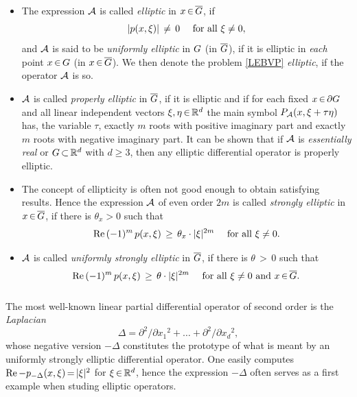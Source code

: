 \documentclass[11pt,twoside]{article}
\begin{document}
\begin{itemize}[leftmargin=12mm]
\item[(E-1)]
The expression ${\mathcal{A}}$ is called \textit{elliptic} in $x {\,\in\,} \overline{G}$,
if
\[
\abs{p(x,\xi)} \, \neq \, 0 \qfa \xi \neq 0,
\]
and ${\mathcal{A}}$ is said to be \textit{uniformly elliptic} in $G$ (in $\overline{G}$),
if it is elliptic in \textit{each} point $x {\,\in\,} G$ (in $x {\,\in\,} \overline{G}$).
We then denote the problem \eqref{LEBVP} \textit{elliptic},
if the operator ${\mathcal{A}}$ is so.

\item[(E-2)]
${\mathcal{A}}$ is called \textit{properly elliptic} in $\overline{G}$,
if it is elliptic and 
if for each fixed $x {\,\in\,} \partial G$ and all linear independent vectors
$\xi, \eta {\,\in\,} {\mathbb{R}}^d$ the main symbol $P_{{\mathcal{A}}}(x, \xi + \tau \eta)$ has,
{\wrt} the variable $\tau$,
exactly $m$ roots with positive imaginary part and
exactly $m$ roots with negative imaginary part.
It can be shown that
if ${\mathcal{A}}$ is \textit{essentially real} or $G {\,\subset\,} {\mathbb{R}}^d$ with $d \geq 3$,
then any elliptic differential operator is properly elliptic.

\item[(E-3)]
The concept of ellipticity is often not good enough
to obtain satisfying results.
Hence the expression ${\mathcal{A}}$ of even order $2m$ 
is called \textit{strongly elliptic} in $x {\,\in\,} \overline{G}$,
if there is $\theta_x> 0$ such that
\[
\re \, (-1)^m \, p(x,\xi)
\, \geq \,
\theta_x \cdot \abs{\xi} ^{2m}
\quad
\fa \xi \neq 0.
\]

\item[(E-4)]
${\mathcal{A}}$ is called \textit{uniformly strongly elliptic} in $\overline{G}$,
if there is $\theta {\,>\,} 0$ such that 
\[
\re \, (-1)^m \, p(x,\xi)
\, \geq \,
\theta \cdot \abs{\xi} ^{2m}
\quad
\fa \xi \neq 0 \and x \xeof \clG.
\]
\end{itemize}

\subparagraph{} %
The most well-known linear partial differential operator of second order
is the \textit{Laplacian}
\[
\Delta = \partial^2 / \partial {x_1}^2 + \ldots
       + \partial^2 / \partial {x_d}^2,
\]
whose negative version $-\Delta$ constitutes the prototype
of what is meant by an {uniformly strongly elliptic} differential operator.
One easily computes
$\re -p_{-\Delta}(x,\xi) \eq \abs{\xi} ^2$ for $\xi {\,\in\,} {\mathbb{R}}^d$,
hence the expression $-\Delta$ often serves as a first example
when studing elliptic operators.
\end{document}
